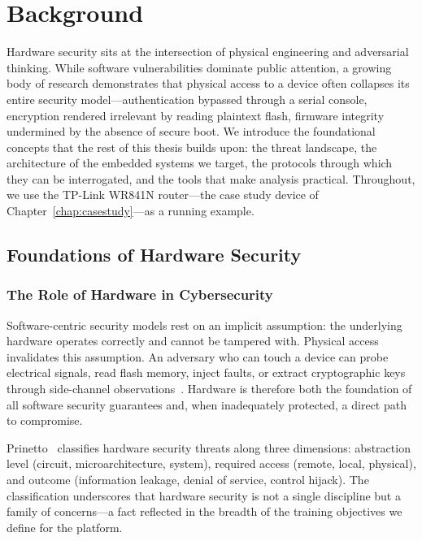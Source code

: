 \chapter{Background}\label{chap:background}

Hardware security sits at the intersection of physical engineering and adversarial thinking. While software vulnerabilities dominate public attention, a growing body of research demonstrates that physical access to a device often collapses its entire security model---authentication bypassed through a serial console, encryption rendered irrelevant by reading plaintext flash, firmware integrity undermined by the absence of secure boot. We introduce the foundational concepts that the rest of this thesis builds upon: the threat landscape, the architecture of the embedded systems we target, the protocols through which they can be interrogated, and the tools that make analysis practical. Throughout, we use the TP-Link WR841N router---the case study device of Chapter~\ref{chap:casestudy}---as a running example.

\section{Foundations of Hardware Security}\label{sec:hw-security}

\subsection{The Role of Hardware in Cybersecurity}\label{subsec:hw-role}

Software-centric security models rest on an implicit assumption: the underlying hardware operates correctly and cannot be tampered with. Physical access invalidates this assumption. An adversary who can touch a device can probe electrical signals, read flash memory, inject faults, or extract cryptographic keys through side-channel observations~\cite{anderson2020security}. Hardware is therefore both the foundation of all software security guarantees and, when inadequately protected, a direct path to compromise.

Prinetto~\cite{prinetto2019hardware} classifies hardware security threats along three dimensions: abstraction level (circuit, microarchitecture, system), required access (remote, local, physical), and outcome (information leakage, denial of service, control hijack). The classification underscores that hardware security is not a single discipline but a family of concerns---a fact reflected in the breadth of the training objectives we define for the \pcbctf{} platform.

